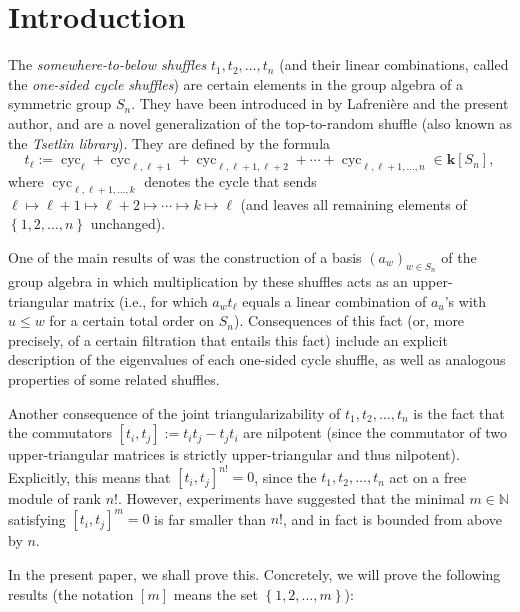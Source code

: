 \documentclass[numbers=enddot,12pt,final,onecolumn,notitlepage]{scrartcl}%
\theoremstyle{definition}
\begin{document}
\section{Introduction}

The \emph{somewhere-to-below shuffles} $t_{1},t_{2},\ldots,t_{n}$ (and their
linear combinations, called the \emph{one-sided cycle shuffles}) are certain
elements in the group algebra of a symmetric group $S_{n}$. They have been
introduced in \cite{s2b1} by Lafreni\`{e}re and the present author, and are a
novel generalization of the top-to-random shuffle (also known as the
\emph{Tsetlin library}). They are defined by the formula%
\[
t_{\ell}:=\operatorname*{cyc}\nolimits_{\ell}+\operatorname*{cyc}%
\nolimits_{\ell,\ell+1}+\operatorname*{cyc}\nolimits_{\ell,\ell+1,\ell
+2}+\cdots+\operatorname*{cyc}\nolimits_{\ell,\ell+1,\ldots,n}\in
\mathbf{k}\left[  S_{n}\right]  ,
\]
where $\operatorname*{cyc}\nolimits_{\ell,\ell+1,\ldots,k}$ denotes the cycle
that sends $\ell\mapsto\ell+1\mapsto\ell+2\mapsto\cdots\mapsto k\mapsto\ell$
(and leaves all remaining elements of $\left\{  1,2,\ldots,n\right\}  $ unchanged).

One of the main results of \cite{s2b1} was the construction of a basis
$\left(  a_{w}\right)  _{w\in S_{n}}$ of the group algebra in which
multiplication by these shuffles acts as an upper-triangular matrix (i.e., for
which $a_{w}t_{\ell}$ equals a linear combination of $a_{u}$'s with $u\leq w$
for a certain total order on $S_{n}$). Consequences of this fact (or, more
precisely, of a certain filtration that entails this fact) include an explicit
description of the eigenvalues of each one-sided cycle shuffle, as well as
analogous properties of some related shuffles.

Another consequence of the joint triangularizability of $t_{1},t_{2}%
,\ldots,t_{n}$ is the fact that the commutators $\left[  t_{i},t_{j}\right]
:=t_{i}t_{j}-t_{j}t_{i}$ are nilpotent (since the commutator of two
upper-triangular matrices is strictly upper-triangular and thus nilpotent).
Explicitly, this means that $\left[  t_{i},t_{j}\right]  ^{n!}=0$, since the
$t_{1},t_{2},\ldots,t_{n}$ act on a free module of rank $n!$. However,
experiments have suggested that the minimal $m\in\mathbb{N}$ satisfying
$\left[  t_{i},t_{j}\right]  ^{m}=0$ is far smaller than $n!$, and in fact is
bounded from above by $n$.

In the present paper, we shall prove this. Concretely, we will prove the
following results (the notation $\left[  m\right]  $ means the set $\left\{
1,2,\ldots,m\right\}  $):
\end{document}
